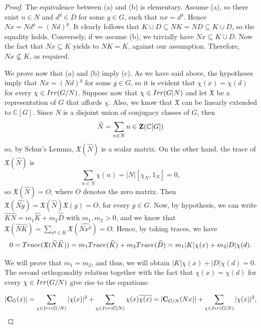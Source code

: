 \documentclass[10pt,a4paper]{amsart}
\begin{document}
\begin{proof}  The  equivalence between (a) and (b) is elementary. Assume (a), so there exist $n\in N$ and $d^g\in D$ for some $g\in G$, such that $nx=d^g$. Hence $Nx=Nd^g=(Nd)^g$. It clearly follows that $K\cup D\subseteq NK=ND\subseteq K\cup D$, so the equality holds. Conversely, if we assume (b), we trivially have $Nx\subseteq K\cup D$. Now the fact that  $Nx\subseteq K$ yields to $NK=K$, against  our assumption. Therefore, $Nx\not\subseteq K$, as required.


\medskip
We prove now that (a) and (b) imply (c). As we have said above, the hypotheses imply that $Nx=(Nd)^g$ for some $g\in G$, so
it is evident that $\chi(x)=\chi(d)$ for every $\chi\in {\rm Irr}(G/N)$.
Suppose now that $\chi\in{\rm Irr}(G|N)$ and let $\mathfrak{X}$ be a representation of $G$ that affords $\chi$.   Also,  we know that $\mathfrak{X}$ can be linearly extended to $\mathbb{C}[G]$.   Since $N$ is a disjoint union of conjugacy classes of $G$, then $$\widehat{ N} = \sum _{n \in N} n\in {\bf Z}(\mathbb{C}[G])$$ so, by Schur's Lemma, $\mathfrak{X}(\widehat{N})$ is a scalar matrix. On the other hand, the trace of $\mathfrak{X}(\widehat{N})$ is $$\sum_{n \in N}\chi(n)=|N|[\chi_N, 1_N] =0,$$ so $\mathfrak{X}(\widehat{N}) = O$, where $O$ denotes the zero matrix. Then $\mathfrak{X}(\widehat{Ng})=\mathfrak{X}(\widehat{N})\mathfrak{X}(g)=O$, for every $g\in G$. Now, by hypothesis, we can write $\widehat{K}\widehat{N} = m_1\widehat{K}+m_2\widehat{D}$ with $m_1, m_2>0$, and we know that $\mathfrak{X}(\widehat{N}\widehat{K})=\sum_{x^g \in K} \mathfrak{X}(\widehat{Nx^g})=O$.
Hence, by taking traces, we have
\begin{equation}
0={\rm Trace}(\mathfrak{X}(\widehat{N}\widehat{K}))=m_1 {\rm Trace}(\widehat{K}) + m_2 {\rm Trace}(\widehat{D})=m_1|K| \chi(x) + m_2|D| \chi(d). \label{eqn1}
\end{equation}

We will prove that $m_1=m_2$, and thus,  we will obtain $|K| \chi(x) +|D| \chi(d)=0$.
The second orthogonality relation together with the fact that  $\chi(x)=\chi(d)$ for every $\chi\in {\rm Irr}(G/N)$  give rise to the equations:

\begin{equation}
|{\bf C}_G(x)|=\sum_{\chi\in {\rm Irr}(G/N)} |\chi(x)|^2
+ \sum_{\chi\in {\rm Irr}(G|N)}
 \chi(x)\overline{\chi(x)}=|{\bf C}_{G/N}(Nx)|+ \sum_{\chi\in {\rm Irr}(G|N)}|\chi(x)|^2,  \label{eqn2}
 \end{equation}


\end{proof}
\end{document}
